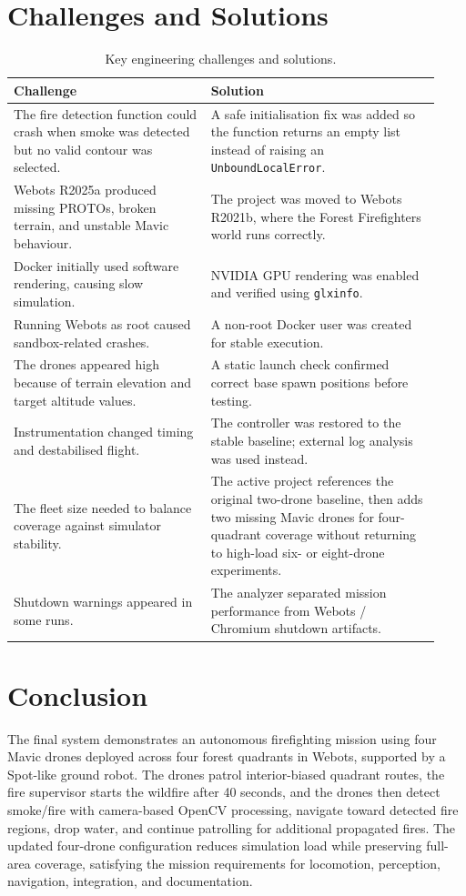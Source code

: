 \documentclass[12pt, a4paper] {report}
\begin{document}
\section{Challenges and Solutions}
\begin{table}[H]
\centering
\caption{Key engineering challenges and solutions.}
\small
\begin{tabular}{p{0.43\linewidth} p{0.50\linewidth}}
\toprule
Challenge & Solution \\
\midrule
The fire detection function could crash when smoke was detected but no valid contour was selected. & A safe initialisation fix was added so the function returns an empty list instead of raising an \texttt{UnboundLocalError}. \\
Webots R2025a produced missing PROTOs, broken terrain, and unstable Mavic behaviour. & The project was moved to Webots R2021b, where the Forest Firefighters world runs correctly. \\
Docker initially used software rendering, causing slow simulation. & NVIDIA GPU rendering was enabled and verified using \texttt{glxinfo}. \\
Running Webots as root caused sandbox-related crashes. & A non-root Docker user was created for stable execution. \\
The drones appeared high because of terrain elevation and target altitude values. & A static launch check confirmed correct base spawn positions before testing. \\
Instrumentation changed timing and destabilised flight. & The controller was restored to the stable baseline; external log analysis was used instead. \\
The fleet size needed to balance coverage against simulator stability. & The active project references the original two-drone baseline, then adds two missing Mavic drones for four-quadrant coverage without returning to high-load six- or eight-drone experiments. \\
Shutdown warnings appeared in some runs. & The analyzer separated mission performance from Webots / Chromium shutdown artifacts. \\
\bottomrule
\end{tabular}
\end{table}

\section{Conclusion}
The final system demonstrates an autonomous firefighting mission using four Mavic drones deployed across four forest quadrants in Webots, supported by a Spot-like ground robot. The drones patrol interior-biased quadrant routes, the fire supervisor starts the wildfire after 40 seconds, and the drones then detect smoke/fire with camera-based OpenCV processing, navigate toward detected fire regions, drop water, and continue patrolling for additional propagated fires. The updated four-drone configuration reduces simulation load while preserving full-area coverage, satisfying the mission requirements for locomotion, perception, navigation, integration, and documentation.
\end{document}
